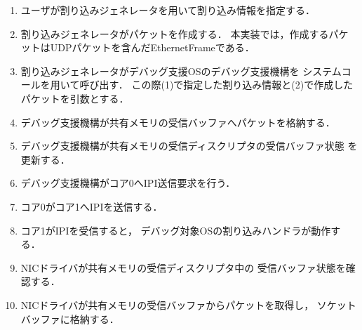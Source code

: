 \documentclass[submit,techreq,noauthor,dvipdfmx]{ipsj}
\begin{document}
\begin{enumerate}
    \item
        ユーザが割り込みジェネレータを用いて割り込み情報を指定する．
    \item 
        割り込みジェネレータがパケットを作成する．
        本実装では，作成するパケットはUDPパケットを含んだEthernetFrameである．
    \item 
        割り込みジェネレータがデバッグ支援OSのデバッグ支援機構を
        システムコールを用いて呼び出す．
        この際(1)で指定した割り込み情報と(2)で作成したパケットを引数とする．
    \item 
        デバッグ支援機構が共有メモリの受信バッファへパケットを格納する．
    \item 
        デバッグ支援機構が共有メモリの受信ディスクリプタの受信バッファ状態
        を更新する．
    \item
        デバッグ支援機構がコア0へIPI送信要求を行う．
    \item
        コア0がコア1へIPIを送信する．
    \item 
        コア1がIPIを受信すると，
        デバッグ対象OSの割り込みハンドラが動作する．
    \item 
        NICドライバが共有メモリの受信ディスクリプタ中の
        受信バッファ状態を確認する．
    \item 
        NICドライバが共有メモリの受信バッファからパケットを取得し，
        ソケットバッファに格納する．
\end{enumerate}
%
%
%
%
\end{document}
